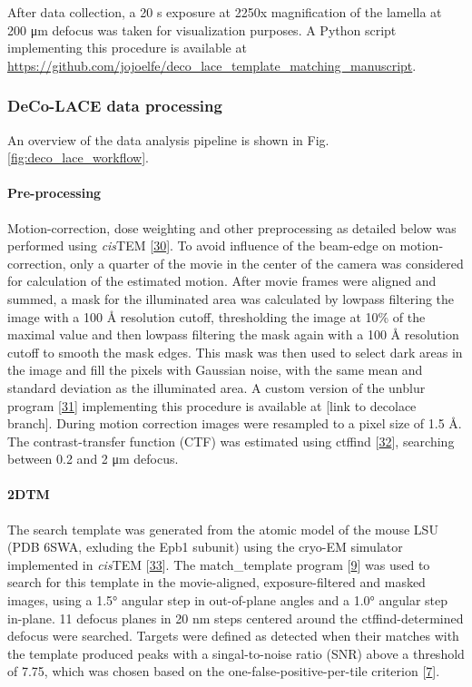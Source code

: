 \documentclass[
]{article}
\begin{document}
After data collection, a 20 s exposure at 2250x magnification of the lamella at
200 μm defocus was taken for visualization purposes. A Python script implementing
this procedure is available at \url{https://github.com/jojoelfe/deco_lace_template_matching_manuscript}.

\hypertarget{deco-lace-data-processing}{%
\subsubsection{DeCo-LACE data processing}\label{deco-lace-data-processing}}

An overview of the data analysis pipeline is shown in Fig.
\ref{fig:deco_lace_workflow}.

\hypertarget{pre-processing}{%
\paragraph{Pre-processing}\label{pre-processing}}

Motion-correction, dose weighting and other preprocessing as detailed below was performed using \emph{cis}TEM {[}\protect\hyperlink{ref-MUY42yxp}{30}{]}. To avoid influence of the beam-edge on motion-correction, only a quarter of the
movie in the center of the camera was considered for calculation of the
estimated motion. After movie frames were aligned and summed, a mask for the
illuminated area was calculated by lowpass filtering the image with a 100 Å
resolution cutoff, thresholding the image at 10\% of the maximal value and then lowpass
filtering the mask again with a 100 Å resolution cutoff to smooth the mask edges. This mask was
then used to select dark areas in the image and fill the pixels with
Gaussian noise, with the same mean and standard deviation as the illuminated
area. A custom version of the unblur program {[}\protect\hyperlink{ref-1G4Y94qCy}{31}{]}
implementing this procedure is available at {[}link to decolace branch{]}. During motion correction images were resampled to a pixel size of 1.5 Å. The
contrast-transfer function (CTF) was estimated using ctffind
{[}\protect\hyperlink{ref-n43f3Sqs}{32}{]}, searching between 0.2 and 2 μm defocus.

\hypertarget{dtm}{%
\paragraph{2DTM}\label{dtm}}

The search template was generated from the atomic model of the mouse LSU
(PDB 6SWA, exluding the Epb1 subunit) using the cryo-EM simulator implemented in \emph{cis}TEM
{[}\protect\hyperlink{ref-q2PSamkS}{33}{]}. The
match\_template program {[}\protect\hyperlink{ref-10bXZuF3G}{9}{]} was used to search for this
template in the movie-aligned, exposure-filtered and masked images, using a 1.5°
angular step in out-of-plane angles and a 1.0° angular step in-plane. 11 defocus
planes in 20 nm steps centered around the ctffind-determined defocus were searched. Targets
were defined as detected when their matches with the template produced peaks
with a singal-to-noise ratio (SNR) above a threshold of 7.75, which was chosen
based on the one-false-positive-per-tile criterion {[}\protect\hyperlink{ref-Ynb3IP6I}{7}{]}.
\end{document}
